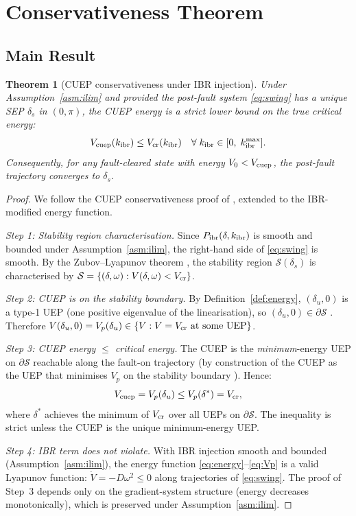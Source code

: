 \documentclass[journal]{IEEEtran}
\newtheorem{theorem}{Theorem}
\newcommand{\kibr}{k_{\rm ibr}}
\newcommand{\Vcuep}{V_{\rm cuep}}
\newcommand{\Vcr}{V_{\rm cr}}
\newcommand{\Vnaught}{V_0}
\newcommand{\deltau}{\delta_u}
\newcommand{\deltas}{\delta_s}
\newcommand{\calS}{\mathcal{S}}
\begin{document}
\section{Conservativeness Theorem}
\label{sec:conservative}

\subsection{Main Result}

\begin{theorem}[CUEP conservativeness under IBR injection]
\label{thm:conservative}
Under Assumption~\ref{asm:ilim} and provided the post-fault system
\eqref{eq:swing} has a unique SEP $\deltas$ in $(0, \pi)$,
the CUEP energy is a strict lower bound on the true critical energy:
\begin{equation}
  \Vcuep(\kibr) \leq \Vcr(\kibr)
  \quad \forall\; \kibr \in [0,\; \kibr^{\max}].
  \label{eq:main_bound}
\end{equation}
Consequently, for any fault-cleared state with energy
$\Vnaught < \Vcuep$, the post-fault trajectory converges to $\deltas$.
\end{theorem}

\begin{proof}
We follow the CUEP conservativeness proof of \cite{Chiang1989CUEP},
extended to the IBR-modified energy function.

\emph{Step 1: Stability region characterisation.}
Since $P_{\rm ibr}(\delta, \kibr)$ is smooth and bounded under
Assumption~\ref{asm:ilim}, the right-hand side of \eqref{eq:swing}
is smooth.  By the Zubov--Lyapunov theorem \cite{Zubov1961}, the
stability region $\calS(\deltas)$ is characterised by
$\calS = \{(\delta, \omega) : V(\delta, \omega) < \Vcr\}$.

\emph{Step 2: CUEP is on the stability boundary.}
By Definition~\ref{def:energy}, $(\deltau, 0)$ is a type-1 UEP
(one positive eigenvalue of the linearisation), so
$(\deltau, 0) \in \partial\calS$ \cite{Chiang1988manifold}.
Therefore $V(\deltau, 0) = V_p(\deltau) \in \{V : V = \Vcr \text{ at some UEP}\}$.

\emph{Step 3: CUEP energy $\leq$ critical energy.}
The CUEP is the \emph{minimum}-energy UEP on $\partial\calS$
reachable along the fault-on trajectory (by construction of the
CUEP as the UEP that minimises $V_p$ on the stability boundary
\cite{Chiang1989CUEP}).  Hence:
\[
  \Vcuep = V_p(\deltau) \leq V_p(\delta^*) = \Vcr,
\]
where $\delta^*$ achieves the minimum of $\Vcr$ over
all UEPs on $\partial\calS$.  The inequality is strict unless
the CUEP is the unique minimum-energy UEP.

\emph{Step 4: IBR term does not violate.}
With IBR injection smooth and bounded (Assumption~\ref{asm:ilim}),
the energy function \eqref{eq:energy}--\eqref{eq:Vp} is a valid
Lyapunov function: $\dot V = -D\omega^2 \leq 0$ along trajectories
of \eqref{eq:swing}.  The proof of Step~3 depends only on the
gradient-system structure (energy decreases monotonically), which
is preserved under Assumption~\ref{asm:ilim}.
\end{proof}
\end{document}
